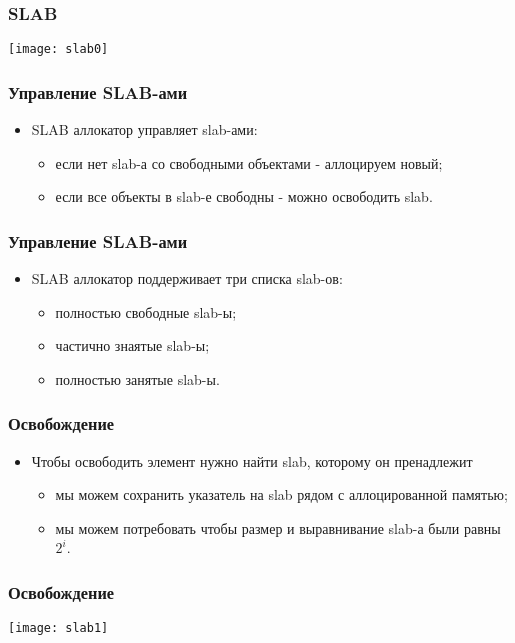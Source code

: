 \begin{frame}
\frametitle{SLAB}
\texttt{[image: slab0]}
\end{frame}

\begin{frame}
\frametitle{Управление SLAB-ами}
\begin{itemize}
    \item<1->SLAB аллокатор управляет slab-ами:
    \begin{itemize}
        \item<2->если нет slab-а со свободными объектами - аллоцируем новый;
        \item<3->если все объекты в slab-е свободны - можно освободить slab.
    \end{itemize}
\end{itemize}
\end{frame}

\begin{frame}
\frametitle{Управление SLAB-ами}
\begin{itemize}
    \item<1->SLAB аллокатор поддерживает три списка slab-ов:
    \begin{itemize}
        \item<2->полностью свободные slab-ы;
        \item<3->частично знаятые slab-ы;
        \item<4->полностью занятые slab-ы.
    \end{itemize}
\end{itemize}
\end{frame}

\begin{frame}
\frametitle{Освобождение}
\begin{itemize}
    \item<1->Чтобы освободить элемент нужно найти slab, которому он пренадлежит
    \begin{itemize}
        \item<2->мы можем сохранить указатель на slab рядом с аллоцированной
        памятью;
        \item<3->мы можем потребовать чтобы размер и выравнивание slab-а были
        равны $2^i$.
    \end{itemize}
\end{itemize}
\end{frame}

\begin{frame}
\frametitle{Освобождение}
\texttt{[image: slab1]}
\end{frame}

